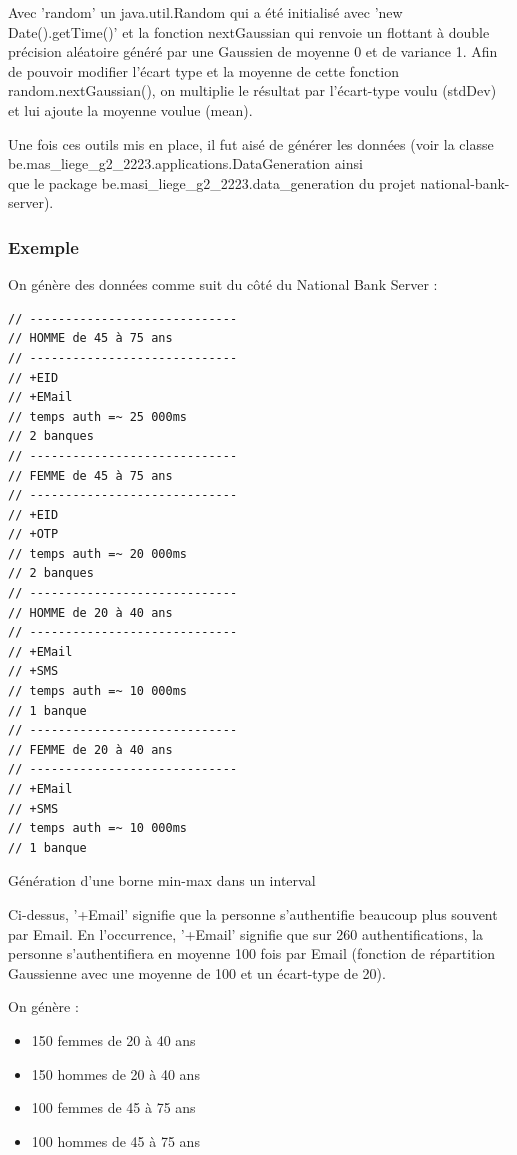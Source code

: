 Avec 'random' un java.util.Random qui a été initialisé avec 'new Date().getTime()' et la fonction nextGaussian qui renvoie un flottant à double précision aléatoire généré par une Gaussien de moyenne 0 et de variance 1. Afin de pouvoir modifier l'écart type et la moyenne de cette fonction random.nextGaussian(), on multiplie le résultat par l'écart-type voulu (stdDev) et lui ajoute la moyenne voulue (mean).

Une fois ces outils mis en place, il fut aisé de générer les données (voir la classe be.mas\_liege\_g2\_2223.applications.DataGeneration ainsi \\ que le package be.masi\_liege\_g2\_2223.data\_generation du projet national-bank-server).

\subsubsection{Exemple}

On génère des données comme suit du côté du National Bank Server :

\begin{listing}[H]
    \begin{verbatim}
// -----------------------------
// HOMME de 45 à 75 ans
// -----------------------------
// +EID
// +EMail
// temps auth =~ 25 000ms
// 2 banques
// -----------------------------
// FEMME de 45 à 75 ans
// -----------------------------
// +EID
// +OTP
// temps auth =~ 20 000ms
// 2 banques
// -----------------------------
// HOMME de 20 à 40 ans
// -----------------------------
// +EMail
// +SMS
// temps auth =~ 10 000ms
// 1 banque
// -----------------------------
// FEMME de 20 à 40 ans
// -----------------------------
// +EMail
// +SMS
// temps auth =~ 10 000ms
// 1 banque
    \end{verbatim}
    \caption{Génération d'une borne min-max dans un interval}
    \label{listing:thibault-generated-data-scheme}
\end{listing}

Ci-dessus, '+Email' signifie que la personne s'authentifie beaucoup plus souvent par Email. En
l'occurrence, '+Email' signifie que sur 260 authentifications, la personne s'authentifiera en moyenne
100 fois par Email (fonction de répartition Gaussienne avec une moyenne de 100 et un écart-type de
20).

On génère :

\begin{itemize}
    \item 150 femmes de 20 à 40 ans
    \item 150 hommes de 20 à 40 ans
    \item 100 femmes de 45 à 75 ans
    \item 100 hommes de 45 à 75 ans
\end{itemize}

